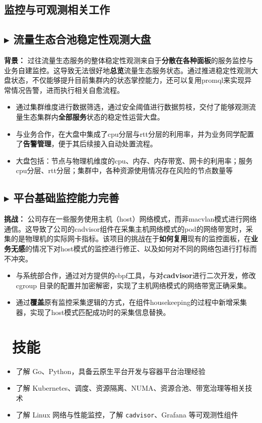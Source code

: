 \documentclass{resume}
\begin{document}
\begin{onehalfspacing}
\vspace{5pt}
\subsection{\large \faEye \textbf{监控与可观测相关工作}}
\subsection{\textbf{$\blacktriangleright$ 流量生态合池稳定性观测大盘}}
\textbf{背景：} 过往流量生态服务的整体稳定性观测来自于\textbf{分散在各种面板}的服务监控与业务自建监控。这导致无法很好地\textbf{总览}流量生态服务状态。通过推进稳定性观测大盘状态，不仅能够提升目前集群内的状态掌控能力，还可以复用promql来实现异常情况告警，进而执行相关自愈流程。
\begin{itemize}
  \item 通过集群维度进行数据筛选，通过安全阈值进行数据剪枝，交付了能够观测流量生态集群内\textbf{全部服务}状态的稳定性运营大盘。
  \item 与业务合作，在大盘中集成了cpu分层与rtt分层的利用率，并为业务同学配置了\textbf{告警管理}，便于其后续接入自动处置流程。
  \item 大盘包括：节点与物理机维度的cpu、内存、内存带宽、网卡的利用率；服务cpu分层、rtt分层；集群中，各种资源使用情况存在风险的节点数量等
\end{itemize}

\subsection{\textbf{$\blacktriangleright$ 平台基础监控能力完善}}
\textbf{挑战：} 公司存在一些服务使用主机（host）网络模式，而非macvlan模式进行网络通信。这导致了公司的cadvisor组件在采集主机网络模式的pod的网络带宽时，采集的是物理机的实际网卡指标。该项目的挑战在于\textbf{如何复用}现有的监控面板，在\textbf{业务无感}的情况下对host模式的监控进行修正、以及如何对不同的网络包进行打标而不冲突。
\begin{itemize}
  \item 与系统部合作，通过对方提供的ebpf工具，与对\textbf{cadvisor}进行二次开发，修改 cgroup 目录的配置并加密解密，实现了主机网络模式的网络带宽正确采集。
  \item 通过\textbf{覆盖}原有监控采集逻辑的方式，在组件housekeeping的过程中新增采集器，实现了host模式匹配成功时的采集信息替换。
\end{itemize}
\end{onehalfspacing}

\section{\faCogs\ 技能}
\begin{itemize}[parsep=0.5ex]
  \item 了解 Go、Python，具备云原生平台开发与容器平台治理经验
  \item 了解 Kubernetes、调度、资源隔离、NUMA、资源合池、带宽治理等相关技术
  \item 了解 Linux 网络与性能监控，了解 \texttt{cadvisor}、Grafana 等可观测性组件
\end{itemize}

%
%
\end{document}
